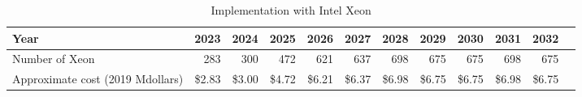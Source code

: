 \tiny \begin{longtable} { |p{}  |r  |r  |r  |r  |r  |r  |r  |r  |r  |r  |r |} 
\caption{Implementation with Intel Xeon \label{tab:opsXeon}}\\ 
\hline 
\textbf{Year}&\textbf{2023}&\textbf{2024}&\textbf{2025}&\textbf{2026}&\textbf{2027}&\textbf{2028}&\textbf{2029}&\textbf{2030}&\textbf{2031}&\textbf{2032} \\ \hline
{Number of Xeon}&{283}&{300}&{472}&{621}&{637}&{698}&{675}&{675}&{698}&{675} \\ \hline
{Approximate cost (2019 Mdollars)}&{\$2.83}&{\$3.00}&{\$4.72}&{\$6.21}&{\$6.37}&{\$6.98}&{\$6.75}&{\$6.75}&{\$6.98}&{\$6.75} \\ \hline
\end{longtable} \normalsize

